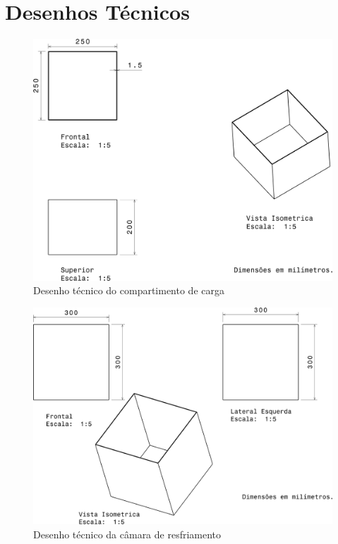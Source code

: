 \section{Desenhos Técnicos}


\begin{figure}[H]
	\centering
	\includegraphics[scale=.5]{figuras/desenho_camara_interna.png}
	\caption{Desenho técnico do compartimento de carga}
\end{figure}


\begin{figure}[H]
	\centering
	\includegraphics[scale=.5]{figuras/desenho_camara_externa.png}
	\caption{Desenho técnico da câmara de resfriamento}
\end{figure}


